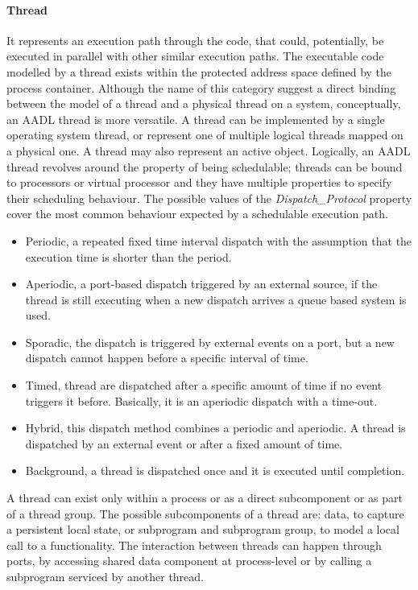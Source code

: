 \paragraph{Thread} It represents an execution path through the code, that could, potentially, be executed in parallel with other similar execution paths. The executable code modelled by a thread exists within the protected address space defined by the process container. Although the name of this category suggest a direct binding between the model of a thread and a physical thread on a system, conceptually, an AADL thread is more versatile. A thread can be implemented by a single operating system thread, or represent one of multiple logical threads mapped on a physical one. A thread may also represent an active object. Logically, an AADL thread revolves around the property of being schedulable; threads can be bound to processors or virtual processor and they have multiple properties to specify their scheduling behaviour. The possible values of the \textit{Dispatch\_Protocol} property cover the most common behaviour expected by a schedulable execution path.
\begin{itemize}
\item Periodic, a repeated fixed time interval dispatch with the assumption that the execution time is shorter than the period.
\item Aperiodic, a port-based dispatch triggered by an external source, if the thread is still executing when a new dispatch arrives a queue based system is used.
\item Sporadic, the dispatch is triggered by external events on a port, but a new dispatch cannot happen before a specific interval of time.
\item Timed, thread are dispatched after a specific amount of time if no event triggers it before. Basically, it is an aperiodic dispatch with a time-out.
\item Hybrid, this dispatch method combines a periodic and aperiodic. A thread is dispatched by an external event or after a fixed amount of time.
\item Background, a thread is dispatched once and it is executed until completion.
\end{itemize}
A thread can exist only within a process or as a direct subcomponent or as part of a thread group. The possible subcomponents of a thread are: data, to capture a persistent local state, or subprogram and subprogram group, to model a local call to a functionality. The interaction between threads can happen through ports, by accessing shared data component at process-level or by calling a subprogram serviced by another thread.

